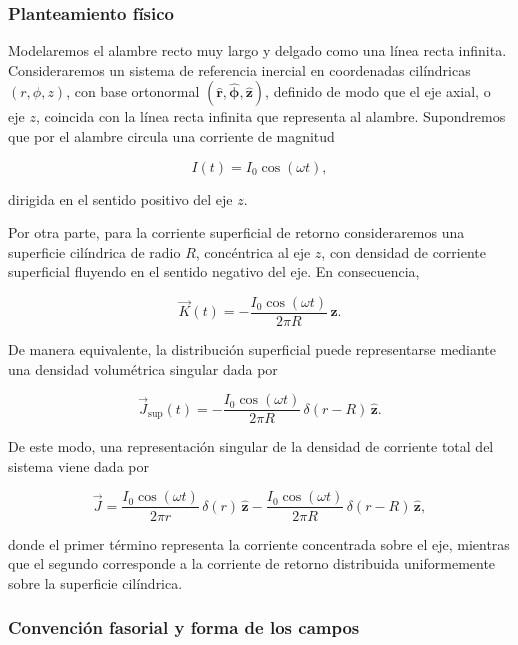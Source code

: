 \documentclass{article}
\numberwithin{equation}{section}
\newcommand{\hr}{\hat{\mathbf r}}
\newcommand{\hp}{\hat{\boldsymbol\phi}}
\newcommand{\hz}{\hat{\mathbf z}}
\begin{document}
\subsubsection{Planteamiento físico}

Modelaremos el alambre recto muy largo y delgado como una línea recta infinita. Consideraremos un sistema de referencia inercial en coordenadas cilíndricas $(r,\phi,z)$, con base ortonormal $(\hr,\hp,\hz)$, definido de modo que el eje axial, o eje $z$, coincida con la línea recta infinita que representa al alambre. Supondremos que por el alambre circula una corriente de magnitud

\begin{equation}\tag{1}\label{eq:1}
    I(t)=I_0\cos(\omega t),
\end{equation}

dirigida en el sentido positivo del eje $z$.

Por otra parte, para la corriente superficial de retorno consideraremos una superficie cilíndrica de radio $R$, concéntrica al eje $z$, con densidad de corriente superficial fluyendo en el sentido negativo del eje. En consecuencia,

\begin{equation}\tag{2}\label{eq:2}
    \vec K(t)=-\frac{I_0\cos(\omega t)}{2\pi R}\,\hz.
\end{equation}

De manera equivalente, la distribución superficial puede representarse mediante una densidad volumétrica singular dada por

\begin{equation}\tag{3}\label{eq:3}
    \vec J_{\text{sup}}(t)=-\frac{I_0\cos(\omega t)}{2\pi R}\,\delta(r-R)\,\hz.
\end{equation}

De este modo, una representación singular de la densidad de corriente total del sistema viene dada por

\begin{equation}\tag{4}\label{eq:4}
    \vec J=\frac{I_0\cos(\omega t)}{2\pi r}\,\delta(r)\,\hz-\frac{I_0\cos(\omega t)}{2\pi R}\,\delta(r-R)\,\hz,
\end{equation}

donde el primer término representa la corriente concentrada sobre el eje, mientras que el segundo corresponde a la corriente de retorno distribuida uniformemente sobre la superficie cilíndrica.

\subsubsection{Convención fasorial y forma de los campos}
\end{document}
